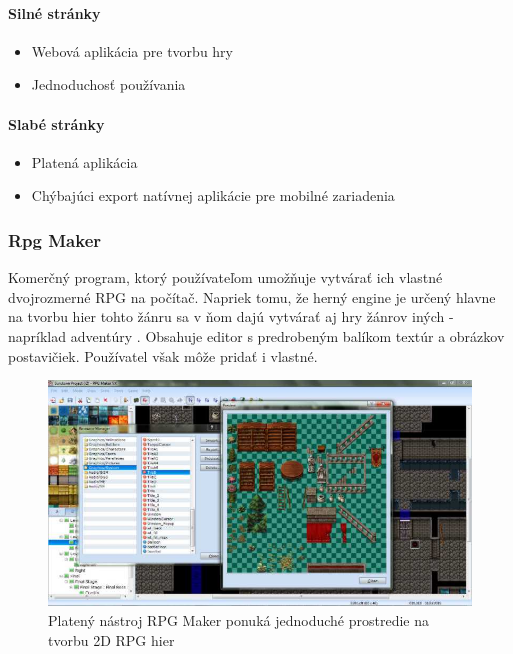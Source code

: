 \paragraph*{Silné stránky}
\begin{itemize}
  \item Webová aplikácia pre tvorbu hry
  \item Jednoduchosť používania
\end{itemize}
\paragraph*{Slabé stránky}
\begin{itemize}
  \item Platená aplikácia
  \item Chýbajúci export natívnej aplikácie pre mobilné zariadenia
\end{itemize}





\subsubsection{Rpg Maker} Komerčný program, ktorý používateľom umožňuje vytvárať ich vlastné dvojrozmerné RPG na počítač. Napriek tomu, že herný engine je určený hlavne na tvorbu hier tohto žánru sa v ňom dajú vytvárať aj hry žánrov iných - napríklad adventúry \cite{rpg-maker-game}. Obsahuje editor s predrobeným balíkom textúr a obrázkov postavičiek. Používatel však môže pridať i vlastné. 
\cite{rpg-maker}
\begin{figure}
  \centering
  \includegraphics[width=14cm]{mainmatter/imgs/rpgmaker.jpg}
  \caption{Platený nástroj RPG Maker ponuká jednoduché prostredie na tvorbu 2D RPG hier}
  \label{fig:comenius}
\end{figure}


